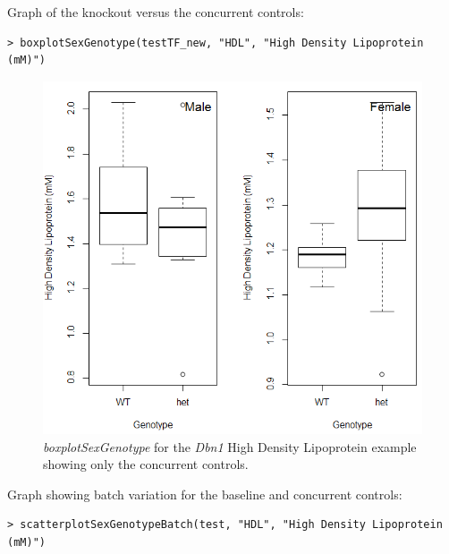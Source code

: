 \documentclass[12pt,a4paper]{article}
\begin{document}
Graph of the knockout versus the concurrent controls:
 
\begingroup
\fontsize{8pt}{12pt}\selectfont
\begin{verbatim}
> boxplotSexGenotype(testTF_new, "HDL", "High Density Lipoprotein (mM)")
\end{verbatim}
\endgroup 

\begin{figure}[H]%
\centerline{\includegraphics[scale=0.5]{cs_tf_2.jpg}}
\caption{\textit{boxplotSexGenotype} for the \textit{Dbn1} High Density Lipoprotein example showing only the concurrent controls.}\label{fig:cs_tf2}
\end{figure}

Graph showing batch variation for the baseline and concurrent controls:
\begingroup
\fontsize{8pt}{12pt}\selectfont
\begin{verbatim}
> scatterplotSexGenotypeBatch(test, "HDL", "High Density Lipoprotein (mM)")
\end{verbatim}
\endgroup 
\end{document}
